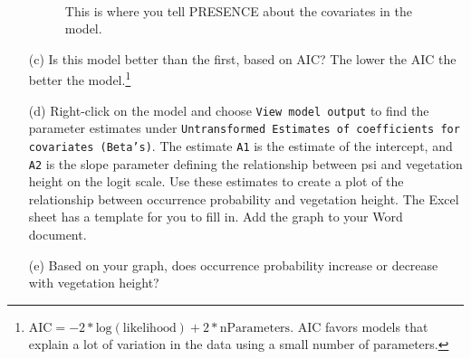 \documentclass[12pt]{article}\usepackage[]{graphicx}\usepackage[]{color}
\begin{document}
\begin{enumerate}
\begin{figure}[h!]
  \centering
   \hfill
     \\
  \caption{\small This is where you tell PRESENCE about the covariates
    in the model.}
  \label{fig:pres-design}
\end{figure}

  \item[(c)] Is this model better than the first, based on AIC? The
    lower the AIC the better the model.\footnote{$\mathrm{AIC} =
      -2*\mathrm{log(likelihood)} + 2*\mathrm{nParameters}$. AIC
      favors models that explain a lot of variation in the data using
      a small number of parameters.}  
  \item[(d)] Right-click on the model and choose 
    \texttt{View model output} to find the parameter estimates under
    \texttt{Untransformed Estimates of coefficients for covariates
      (Beta's)}.  The estimate \texttt{A1} is the estimate of the
    intercept, and \texttt{A2} is the slope parameter defining the
    relationship between psi and vegetation height on the logit
    scale. Use these estimates to create a plot of the relationship
    between occurrence probability and vegetation height. The Excel
    sheet has a template for you to fill in. Add the graph to your
    Word document.
  \item[(e)] Based on your graph, does occurrence probability
    increase or decrease with vegetation height?  
\end{enumerate}
\end{document}

